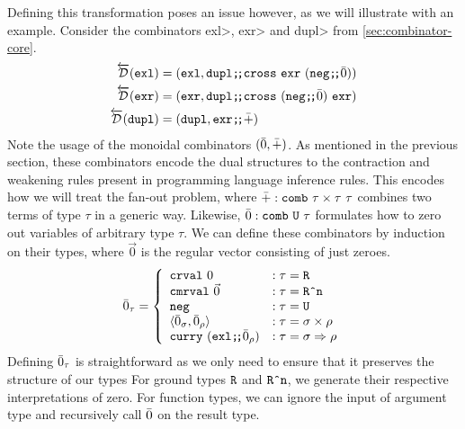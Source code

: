   Defining this transformation poses an issue however, as we will illustrate with an example.
  Consider the combinators \<exl>, \<exr> and \<dupl> from \cref{sec:combinator-core}.
  \begin{align*}
    \overleftarrow{\mathcal{D}}(\texttt{exl}) &= (\texttt{exl}, \texttt{dupl} \texttt{;\!;} \texttt{cross}\ \texttt{exr}\ (\texttt{neg} \texttt{;\!;} \bar{0})) \\
    \overleftarrow{\mathcal{D}}(\texttt{exr}) &= (\texttt{exr}, \texttt{dupl} \texttt{;\!;} \texttt{cross}\ (\texttt{neg} \texttt{;\!;} \bar{0})\ \texttt{exr}) \\
    \overleftarrow{\mathcal{D}}(\texttt{dupl}) &= (\texttt{dupl}, \texttt{exr} \texttt{;\!;} \bar{+})
  \end{align*}
  Note the usage of the monoidal combinators $(\bar{0}, \bar{+})$.
  As mentioned in the previous section, these combinators encode the dual structures to the contraction and weakening rules present in programming language inference rules.
  This encodes how we will treat the fan-out problem, where $\bar{+} : \texttt{comb}\ \tau \times \tau\ \tau$ combines two terms of type $\tau$ in a generic way.
  Likewise, $\bar{0} : \texttt{comb}\ \texttt{U}\ \tau$ formulates how to zero out variables of arbitrary type $\tau$.
  We can define these combinators by induction on their types, where $\vec{0}$ is the regular vector consisting of just zeroes.
  \begin{align*}
    \bar{0}_\tau =
      \left\{
        \begin{array}{ll}
          \texttt{crval}\ 0 & : \tau = \texttt{R} \\
          \texttt{cmrval}\ \vec{0} & : \tau = \texttt{R\^{}n} \\
          \texttt{neg} & : \tau = \texttt{U} \\
          \langle \bar{0}_\sigma, \bar{0}_\rho \rangle & : \tau = \sigma \times \rho \\
          \texttt{curry}\ (\texttt{exl} \texttt{;\!;} \bar{0}_\rho) & : \tau = \sigma \Rightarrow \rho \\
        \end{array}
      \right.
  \end{align*}
  Defining $\bar{0}_\tau$ is straightforward as we only need to ensure that it preserves the structure of our types
  For ground types $\texttt{R}$ and $\texttt{R\^{}n}$, we generate their respective interpretations of zero.
  For function types, we can ignore the input of argument type and recursively call $\bar{0}$ on the result type.

